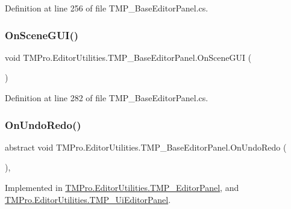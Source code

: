 Definition at line 256 of file T\+M\+P\+\_\+\+Base\+Editor\+Panel.\+cs.

\mbox{\label{class_t_m_pro_1_1_editor_utilities_1_1_t_m_p___base_editor_panel_a0f6360d66e05b77ee4d9dd46b00f4dad}} 
\subsubsection{\texorpdfstring{OnSceneGUI()}{OnSceneGUI()}}
{\footnotesize\ttfamily void T\+M\+Pro.\+Editor\+Utilities.\+T\+M\+P\+\_\+\+Base\+Editor\+Panel.\+On\+Scene\+G\+UI (\begin{DoxyParamCaption}{ }\end{DoxyParamCaption})}



Definition at line 282 of file T\+M\+P\+\_\+\+Base\+Editor\+Panel.\+cs.

\mbox{\label{class_t_m_pro_1_1_editor_utilities_1_1_t_m_p___base_editor_panel_a03f1303365c95a93f4fae9cb11af7df7}} 
\subsubsection{\texorpdfstring{OnUndoRedo()}{OnUndoRedo()}}
{\footnotesize\ttfamily abstract void T\+M\+Pro.\+Editor\+Utilities.\+T\+M\+P\+\_\+\+Base\+Editor\+Panel.\+On\+Undo\+Redo (\begin{DoxyParamCaption}{ }\end{DoxyParamCaption})\hspace{0.3cm}{\ttfamily [protected]}, {}}



Implemented in \mbox{\hyperlink{class_t_m_pro_1_1_editor_utilities_1_1_t_m_p___editor_panel_a30162b44fb34ae79fc36af4984f49062}{T\+M\+Pro.\+Editor\+Utilities.\+T\+M\+P\+\_\+\+Editor\+Panel}}, and \mbox{\hyperlink{class_t_m_pro_1_1_editor_utilities_1_1_t_m_p___ui_editor_panel_ae144f22de63b6a77615fde93e9b047a7}{T\+M\+Pro.\+Editor\+Utilities.\+T\+M\+P\+\_\+\+Ui\+Editor\+Panel}}.



